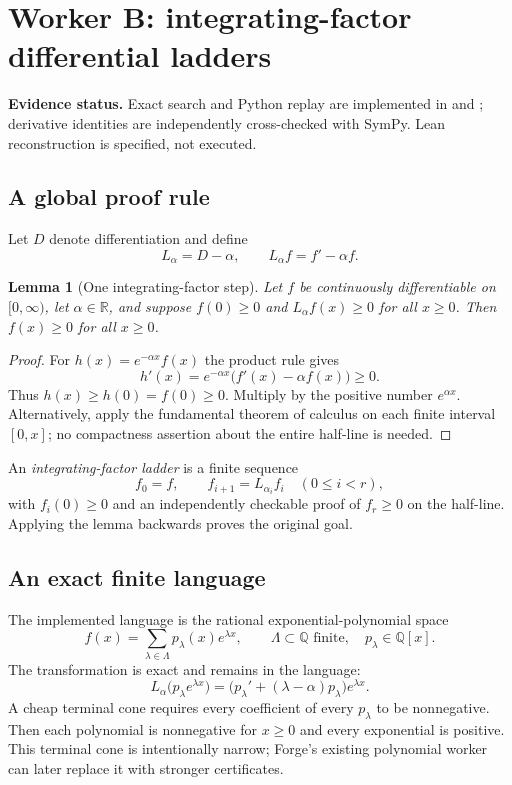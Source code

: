 \documentclass[11pt,a4paper]{article}
\newtheorem{lemma}[theorem]{Lemma}
\theoremstyle{definition}\newtheorem{definition}[theorem]{Definition}
\newcommand{\R}{\mathbb R}\newcommand{\Q}{\mathbb Q}\newcommand{\N}{\mathbb N}
\newcommand{\code}[1]{\texttt{\detokenize{#1}}}
\newcommand{\status}[1]{\par\noindent\textbf{Evidence status.} #1\par}
\begin{document}
\section{Worker B: integrating-factor differential ladders}
\label{sec:ladder}
\status{Exact search and Python replay are implemented in \code{ladders.py}
and \code{checker.py}; derivative identities are independently cross-checked
with SymPy. Lean reconstruction is specified, not executed.}

\subsection{A global proof rule}

Let $D$ denote differentiation and define
\[
 L_\alpha=D-\alpha,\qquad L_\alpha f=f'-\alpha f.
\]

\begin{lemma}[One integrating-factor step]\label{lem:factorstep}
Let $f$ be continuously differentiable on $[0,\infty)$, let $\alpha\in\R$,
and suppose $f(0)\ge0$ and $L_\alpha f(x)\ge0$ for all $x\ge0$. Then
$f(x)\ge0$ for all $x\ge0$.
\end{lemma}
\begin{proof}
For $h(x)=e^{-\alpha x}f(x)$ the product rule gives
\[
 h'(x)=e^{-\alpha x}\bigl(f'(x)-\alpha f(x)\bigr)\ge0.
\]
Thus $h(x)\ge h(0)=f(0)\ge0$. Multiply by the positive number $e^{\alpha x}$.
Alternatively, apply the fundamental theorem of calculus on each finite
interval $[0,x]$; no compactness assertion about the entire half-line is needed.
\end{proof}

An \emph{integrating-factor ladder} is a finite sequence
\[
 f_0=f,\qquad f_{i+1}=L_{\alpha_i}f_i\quad(0\le i<r),
\]
with $f_i(0)\ge0$ and an independently checkable proof of $f_r\ge0$ on the
half-line. Applying the lemma backwards proves the original goal.

\subsection{An exact finite language}

The implemented language is the rational exponential-polynomial space
\[
 f(x)=\sum_{\lambda\in\Lambda}p_\lambda(x)e^{\lambda x},
 \qquad\Lambda\subset\Q\text{ finite},\quad p_\lambda\in\Q[x].
\]
The transformation is exact and remains in the language:
\begin{equation}\label{eq:rateupdate}
 L_\alpha\bigl(p_\lambda e^{\lambda x}\bigr)
 =\bigl(p_\lambda'+(\lambda-\alpha)p_\lambda\bigr)e^{\lambda x}.
\end{equation}
A cheap terminal cone requires every coefficient of every $p_\lambda$ to be
nonnegative. Then each polynomial is nonnegative for $x\ge0$ and every
exponential is positive. This terminal cone is intentionally narrow; Forge's
existing polynomial worker can later replace it with stronger certificates.
\end{document}
